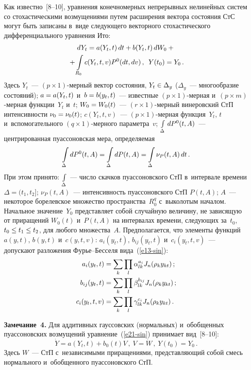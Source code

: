 \begin{multicols}{2}
Как известно~[8--10],  уравнения конечномерных непрерывных 
нелинейных систем со стохастическими возмущениями путем расширения вектора 
состояния СтС могут быть записаны в~виде сле\-ду\-юще\-го векторного стохастического 
дифференциального уравнения Ито:
  \begin{multline}
  dY_t = a(Y_t, t) \,dt + b (Y_t, t)\, dW_0+{}\\
  {}+ \int\limits_{R_0} c (Y_t, t, v) P^0 (dt, dv)\,,\enskip 
  Y(t_0) = Y_0\,.\label{e21-sin}
  \end{multline}
Здесь $Y_t$~--- $(p\times 1)$-мер\-ный вектор состояния, $Y_t \hm\in \Delta_y$ 
($\Delta_y$~--- многообразие состояний);  $a\hm=a(Y_t, t)$ и~$b\hm=b(y_t, t)$~--- 
известные  $(p\times 1)$-мер\-ная и~$(p\times m)$-мер\-ная функции~$Y_t$ и~$t$;  
$W_0\hm= W_0(t)$~--- $(r\times 1)$-мер\-ный винеровский СтП 
интенсивности  $\nu_0 \hm= \nu_0(t)$; $c(Y_t, t, v)$~--- $(p\times 1)$-мер\-ная 
функция~$Y_t$, $t$ и~вспомогательного $(q\times 1)$-мер\-но\-го параметра~$v$; 
$\int\limits_{\Delta}\,dP^0 (t, A)$~--- центрированная пуассоновская мера, определя\-емая
    $$
    \int\limits_{\Delta} dP^0 (t, A) = \int\limits_{\Delta} dP (t,A) =\int\limits_{\Delta} \nu_P (t,A) \,dt\,.
    $$
При этом принято: $\int\limits_{\Delta}$~--- число скачков пуассоновского
СтП в~интервале времени  $\Delta = (t_1, t_2]$; $\nu_P (t, A)$~---
интенсивность пуассоновского СтП  $P(t,A)$; $A$~--- некоторое
борелевское множество пространства~$R_0^q$ с~выколотым началом.
Начальное значение~$Y_0$ представляет собой случайную величину, не
зависящую от приращений $W_0(t)$ и~$P(t,A)$ на интервалах времени,
следующих за~$t_0$, $t_0\hm \le t_1\hm\le t_2$, для любого множества~$A$.
Предполагается, что элементы функций $a(y,t)$, $b(y,t)$ и~$c(y,t,v)$:
$a_i (y_t, t)$, $b_{ij} (y_t, t)$ и~$ c_i (y_t, t, v)$~--- допускают
разложения Фурье--Бес\-се\-ля вида~(\ref{e13-sin}):
\begin{align*}
a_i (y_t, t) &= \sum\limits_k \prod_l \alpha_{lk}^{a_i} J_n (\rho_k y_{kt})\,;\\
b_{ij} (y_t, t) &= \sum\limits_k \prod_l \beta_{lk}^{b_{ij}} J_n (\rho_k y_{kt})\,;\\
c_i (y_t, t,v) &= \sum\limits_k \prod_l \gamma_{lk}^{c_i} J_n (\rho_k y_{kt})\,.
\end{align*}

\noindent
\textbf{Замечание~4.}
Для аддитивных гауссовских (нормальных) и~обобщенных пуассоновских возмущений 
уравнение~(\ref{e21-sin}) принимает  вид~[8--10]:
\begin{equation}
\dot Y = a(Y_t,t)+ b_0 (t) V\,, \  V = \dot W\,,\  Y(t_0) = Y_0\,.
\label{e22-sin}
\end{equation}
Здесь $W$~--- СтП с~независимыми приращениями, представляющий собой смесь 
нормального и~обобщенного пуассоновского СтП.



\end{multicols}
